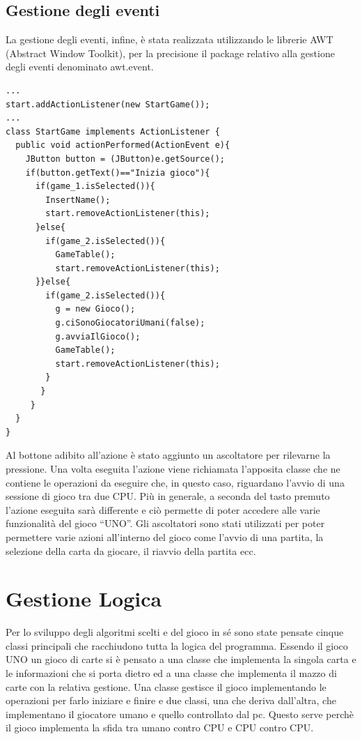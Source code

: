 	\subsection{Gestione degli eventi}
		La gestione degli eventi, infine, è stata realizzata utilizzando le librerie AWT (Abstract Window Toolkit), per la precisione il package relativo alla gestione degli eventi denominato awt.event. 
\begin{lstlisting}
...
start.addActionListener(new StartGame());
...
class StartGame implements ActionListener {		
  public void actionPerformed(ActionEvent e){
    JButton button = (JButton)e.getSource();
    if(button.getText()=="Inizia gioco"){
      if(game_1.isSelected()){
	    InsertName();
	    start.removeActionListener(this);
      }else{
	    if(game_2.isSelected()){
		  GameTable();
		  start.removeActionListener(this);
	  }}else{			
		if(game_2.isSelected()){
		  g = new Gioco();
		  g.ciSonoGiocatoriUmani(false);
		  g.avviaIlGioco();							
		  GameTable();
		  start.removeActionListener(this);
		}
	   }
     }
  }
}

\end{lstlisting}

	Al bottone adibito all'azione è stato aggiunto un ascoltatore per rilevarne la pressione. Una volta eseguita l'azione viene richiamata l'apposita classe che ne contiene le operazioni da eseguire che, in questo caso, riguardano l’avvio di una sessione di gioco tra due CPU. Più in generale, a seconda del tasto premuto l'azione eseguita sarà differente e ciò permette di poter accedere alle varie funzionalità del gioco “UNO”. Gli ascoltatori sono stati utilizzati per poter permettere varie azioni all’interno del gioco come l’avvio di una partita, la selezione della carta da giocare, il riavvio della partita ecc.	
		
\newpage
\section{Gestione Logica}		
	Per lo sviluppo degli algoritmi scelti e del gioco in sé sono state pensate cinque classi principali che racchiudono tutta la logica del programma. Essendo il gioco UNO un gioco di carte si è pensato a una classe che implementa la singola carta e le informazioni che si porta dietro ed a una classe che implementa il mazzo di carte con la relativa gestione. Una classe gestisce il gioco implementando le operazioni per farlo iniziare e finire e due classi, una che deriva dall'altra, che implementano il giocatore umano e quello controllato dal pc. Questo serve perchè il gioco implementa la sfida tra umano contro CPU e CPU contro CPU.
	
